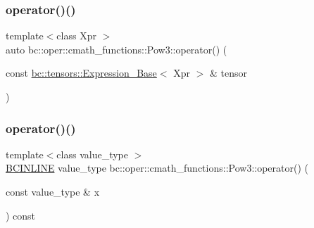 \mbox{\label{structbc_1_1oper_1_1cmath__functions_1_1Pow3_a98c1195eb689341c75c61c9f69c01a91}} 
\subsubsection{\texorpdfstring{operator()()}{operator()()}\hspace{0.1cm}{\footnotesize\ttfamily [2/3]}}
{\footnotesize\ttfamily template$<$class Xpr $>$ \\
auto bc\+::oper\+::cmath\+\_\+functions\+::\+Pow3\+::operator() (\begin{DoxyParamCaption}\item[{const \hyperlink{classbc_1_1tensors_1_1Expression__Base}{bc\+::tensors\+::\+Expression\+\_\+\+Base}$<$ Xpr $>$ \&}]{tensor }\end{DoxyParamCaption})\hspace{0.3cm}{\ttfamily [inline]}}

\mbox{\label{structbc_1_1oper_1_1cmath__functions_1_1Pow3_a108deaaf09f199af0335f01bec74c858}} 
\subsubsection{\texorpdfstring{operator()()}{operator()()}\hspace{0.1cm}{\footnotesize\ttfamily [3/3]}}
{\footnotesize\ttfamily template$<$class value\+\_\+type $>$ \\
\hyperlink{common_8h_a6699e8b0449da5c0fafb878e59c1d4b1}{B\+C\+I\+N\+L\+I\+NE} value\+\_\+type bc\+::oper\+::cmath\+\_\+functions\+::\+Pow3\+::operator() (\begin{DoxyParamCaption}\item[{const value\+\_\+type \&}]{x }\end{DoxyParamCaption}) const\hspace{0.3cm}{\ttfamily [inline]}}



